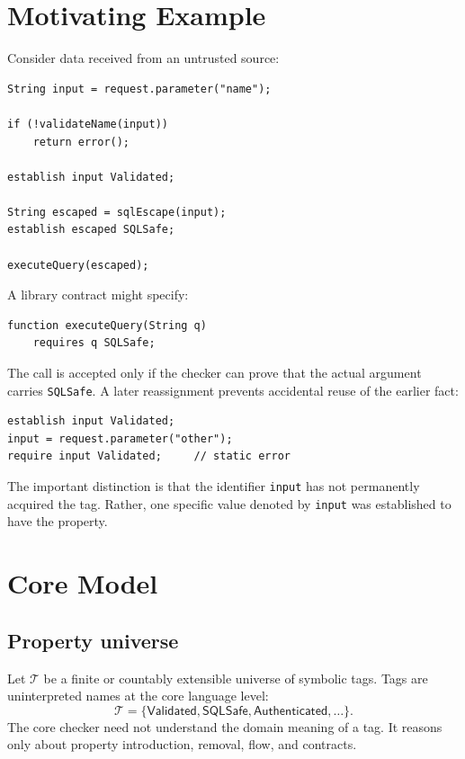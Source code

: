 \documentclass[11pt]{article}
\begin{document}
\section{Motivating Example}
Consider data received from an untrusted source:

\begin{lstlisting}
String input = request.parameter("name");

if (!validateName(input))
    return error();

establish input Validated;

String escaped = sqlEscape(input);
establish escaped SQLSafe;

executeQuery(escaped);
\end{lstlisting}

A library contract might specify:

\begin{lstlisting}
function executeQuery(String q)
    requires q SQLSafe;
\end{lstlisting}

The call is accepted only if the checker can prove that the actual argument carries \texttt{SQLSafe}. A later reassignment prevents accidental reuse of the earlier fact:

\begin{lstlisting}
establish input Validated;
input = request.parameter("other");
require input Validated;     // static error
\end{lstlisting}

The important distinction is that the identifier \texttt{input} has not permanently acquired the tag. Rather, one specific value denoted by \texttt{input} was established to have the property.

\section{Core Model}

\subsection{Property universe}
Let $\mathcal{T}$ be a finite or countably extensible universe of symbolic tags. Tags are uninterpreted names at the core language level:
\[
\mathcal{T} = \{\textsf{Validated}, \textsf{SQLSafe}, \textsf{Authenticated}, \ldots\}.
\]
The core checker need not understand the domain meaning of a tag. It reasons only about property introduction, removal, flow, and contracts.
\end{document}
